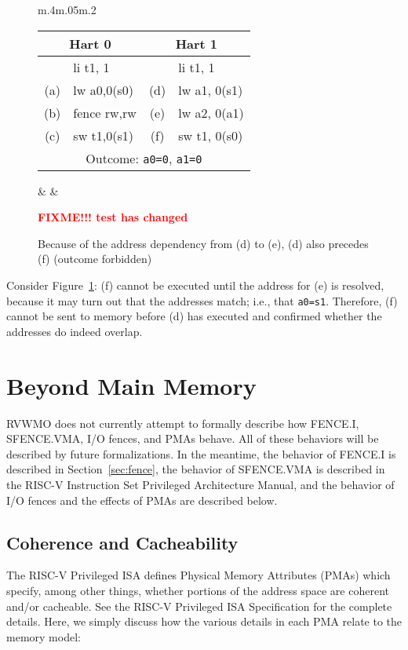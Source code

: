 \begin{figure}[h!]
  \centering
  \begin{tabular}{m{.4\linewidth}m{.05\linewidth}m{.2\linewidth}}
    \tt\small
    \begin{tabular}{cl||cl}
    \multicolumn{2}{c}{Hart 0} & \multicolumn{2}{c}{Hart 1} \\
    \hline
        & li t1, 1    &     & li t1, 1       \\
    (a) & lw a0,0(s0) & (d) & lw a1, 0(s1)   \\
    (b) & fence rw,rw & (e) & lw a2, 0(a1)   \\
    (c) & sw t1,0(s1) & (f) & sw t1, 0(s0)   \\
    \hline
    \multicolumn{4}{c}{Outcome: {\tt a0=0}, {\tt a1=0}}
    \end{tabular}  
    & &
    
    \textcolor{red}{\bf FIXME!!! test has changed}
  \end{tabular}
  \caption{Because of the address dependency from (d) to (e), (d) also precedes (f) (outcome forbidden)}
  \label{fig:litmus:addrpo}
\end{figure}

Consider Figure~\ref{fig:litmus:addrpo}:
(f) cannot be executed until the address for (e) is resolved, because it may turn out that the addresses match; i.e., that {\tt a0=s1}.  Therefore, (f) cannot be sent to memory before (d) has executed and confirmed whether the addresses do indeed overlap.


\section{Beyond Main Memory}

RVWMO does not currently attempt to formally describe how FENCE.I, SFENCE.VMA, I/O fences, and PMAs behave.
All of these behaviors will be described by future formalizations.
In the meantime, the behavior of FENCE.I is described in Section~\ref{sec:fence}, the behavior of SFENCE.VMA is described in the RISC-V Instruction Set Privileged Architecture Manual, and the behavior of I/O fences and the effects of PMAs are described below.

\subsection{Coherence and Cacheability}

The RISC-V Privileged ISA defines Physical Memory Attributes (PMAs) which specify, among other things, whether portions of the address space are coherent and/or cacheable.
See the RISC-V Privileged ISA Specification for the complete details.
Here, we simply discuss how the various details in each PMA relate to the memory model:


